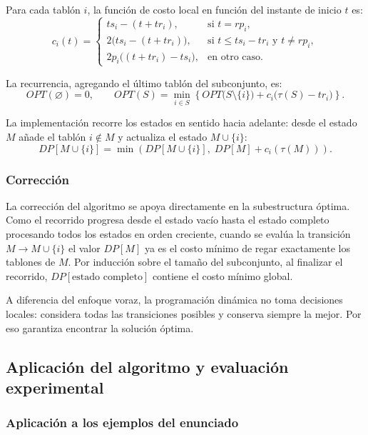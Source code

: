 \documentclass[12pt,a4paper]{article}
\newcommand{\cost}[1]{c_{#1}}
\begin{document}
Para cada tabl\'on \(i\), la funci\'on de costo local en funci\'on del instante de inicio \(t\) es:
\[
\cost{i}(t)=
\begin{cases}
ts_i - (t + tr_i), & \text{si } t = rp_i, \\[4pt]
2\bigl(ts_i - (t + tr_i)\bigr), & \text{si } t \leq ts_i - tr_i \text{ y } t \neq rp_i, \\[4pt]
2p_i\bigl((t + tr_i) - ts_i\bigr), & \text{en otro caso.}
\end{cases}
\]

La recurrencia, agregando el \'ultimo tabl\'on del subconjunto, es:
\[
OPT(\varnothing)=0,
\qquad
OPT(S)=\min_{i\in S}\left\{ OPT\bigl(S\setminus\{i\}\bigr) + \cost{i}\bigl(\tau(S)-tr_i\bigr) \right\}.
\]

La implementaci\'on recorre los estados en sentido hacia adelante: desde el estado \(M\) a\~nade el tabl\'on \(i \notin M\) y actualiza el estado \(M \cup \{i\}\):
\[
DP[M \cup \{i\}] =
\min\left(DP[M \cup \{i\}],\; DP[M] + \cost{i}(\tau(M))\right).
\]

\subsubsection{Correcci\'on}

La correcci\'on del algoritmo se apoya directamente en la subestructura \'optima. Como el recorrido progresa desde el estado vac\'io hasta el estado completo procesando todos los estados en orden creciente, cuando se eval\'ua la transici\'on \(M \to M \cup \{i\}\) el valor \(DP[M]\) ya es el costo m\'inimo de regar exactamente los tablones de \(M\). Por inducci\'on sobre el tama\~no del subconjunto, al finalizar el recorrido, \(DP[\text{estado completo}]\) contiene el costo m\'inimo global.

A diferencia del enfoque voraz, la programaci\'on din\'amica no toma decisiones locales: considera todas las transiciones posibles y conserva siempre la mejor. Por eso garantiza encontrar la soluci\'on \'optima.

\subsection{Aplicaci\'on del algoritmo y evaluaci\'on experimental}

\subsubsection{Aplicaci\'on a los ejemplos del enunciado}
\end{document}
